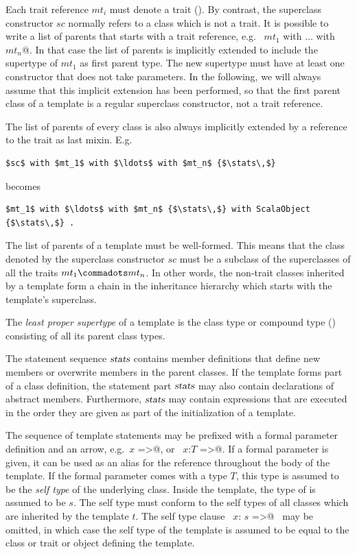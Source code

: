Each trait reference $mt_i$ must denote a trait ().
By contrast, the superclass constructor $sc$ normally refers to a
class which is not a trait. It is possible to write a list of
parents that starts with a trait reference, e.g.
~\lstinline@$mt_1$ with $\ldots$ with $mt_n$@. In that case the list
of parents is implicitly extended to include the supertype of $mt_1$
as first parent type. The new supertype must have at least one
constructor that does not take parameters.  In the following, we will
always assume that this implicit extension has been performed, so that
the first parent class of a template is a regular superclass
constructor, not a trait reference.

The list of parents of every class is also always implicitly extended
by a reference to the  trait as last
mixin. E.g.\
\begin{lstlisting}
$sc$ with $mt_1$ with $\ldots$ with $mt_n$ {$\stats\,$}
\end{lstlisting}
becomes
\begin{lstlisting}
$mt_1$ with $\ldots$ with $mt_n$ {$\stats\,$} with ScalaObject {$\stats\,$} .
\end{lstlisting}

The list of parents of a template must be well-formed. This means that
the class denoted by the superclass constructor $sc$ must be a
subclass of the superclasses of all the traits $mt_1 \commadots mt_n$.
In other words, the non-trait classes inherited by a template form a
chain in the inheritance hierarchy which starts with the template's
superclass.

The {\em least proper supertype} of a template is the class type or
compound type (\sref{sec:compound-types}) consisting of all its parent
class types. 

The statement sequence $\mbox{\sl stats}$ contains member definitions that
define new members or overwrite members in the parent classes.  If the
template forms part of a class definition, the statement part $\mbox{\sl stats}$
may also contain declarations of abstract members. Furthermore,
$\mbox{\sl stats}$ may contain expressions that are executed in the order they
are given as part of the initialization of a template.

The sequence of template statements may be prefixed with a formal
parameter definition and an arrow, e.g.\ \lstinline@$x$ =>@, or
~\lstinline@$x$:$T$ =>@.  If a formal parameter is given, it can be
used as an alias for the reference \lstinline@this@ throughout the
body of the template.  If the formal parameter comes with a type $T$,
this type is assumed to be the {\em self type}
of the underlying class. 
Inside the template, the type of  is assumed to be $s$.
The self type 
must conform to the self types of all classes which are inherited
by the template $t$. The self type clause ~\lstinline@$x$: $s$ =>@~ may be
omitted, in which case the self type of the template is assumed to be
equal to the class or trait or object defining the template.

